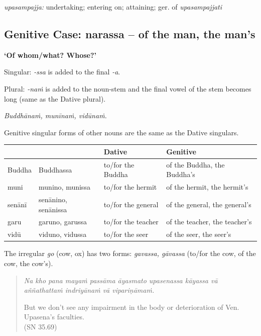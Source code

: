 \documentclass[11pt,oneside]{memoir}
\begin{document}
\normalArrayStrech

\emph{upasampajja:} undertaking; entering on; attaining; ger. of \emph{upasampajjati}

\clearpage

\subsection{Genitive Case: narassa -- of the man, the man's}
\label{sec:org2481d80}

\textbf{`Of whom/what? Whose?'}

Singular: \emph{-ssa} is added to the final \emph{-a}.

Plural: \emph{-naṁ} is added to the noun-stem and the final vowel of the stem becomes long (same as the Dative plural).

\emph{Buddhānaṁ, munīnaṁ, vidūnaṁ.}

Genitive singular forms of other nouns are the same as the Dative singulars.

\begin{center}
\begin{tabular}{llll}
 &  & Dative & Genitive\\[0pt]
\hline
Buddha & Buddhassa & to/for the Buddha & of the Buddha, the Buddha's\\[0pt]
muni & munino, munissa & to/for the hermit & of the hermit, the hermit's\\[0pt]
senānī & senānino, senānissa & to/for the general & of the general, the general's\\[0pt]
garu & garuno, garussa & to/for the teacher & of the teacher, the teacher's\\[0pt]
vidū & viduno, vidussa & to/for the seer & of the seer, the seer's\\[0pt]
\end{tabular}
\end{center}

The irregular \emph{go} (cow, ox) has two forms: \emph{gavassa, gāvassa} (to/for the cow, of the cow, the cow's).

\begin{quote}
\emph{Na kho pana mayaṁ passāma āyasmato upasenassa kāyassa vā aññathattaṁ indriyānaṁ vā vipariṇāmaṁ.}

But we don't see any impairment in the body or deterioration of Ven. Upasena's faculties. \\[0pt]
(SN 35.69)
\end{quote}

\renewcommand{\arraystretch}{1.7}
\end{document}
